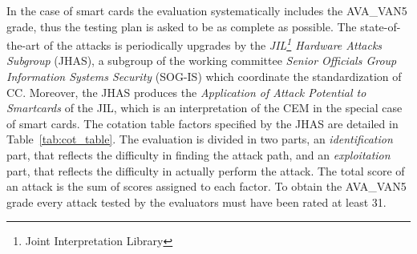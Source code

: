 In the case of smart cards the evaluation systematically includes the AVA\_VAN5 grade, thus the testing plan is asked to be as complete as possible. The state-of-the-art of the attacks is periodically upgrades by the \emph{JIL\footnote{Joint Interpretation Library} Hardware Attacks Subgroup} (JHAS), a subgroup of the working committee \emph{Senior Officials Group Information Systems Security} (SOG-IS) which coordinate the standardization of CC. Moreover, the JHAS produces the \emph{Application of Attack Potential to Smartcards} \cite{JIL} of the JIL, which is an interpretation of the CEM in the special case of smart cards. The cotation table factors specified by the JHAS are detailed in Table~\ref{tab:cot_table}. The evaluation is divided in two parts, an \emph{identification} part, that reflects the difficulty in finding the attack path, and an \emph{exploitation} part, that reflects the difficulty in actually perform the attack. The total score of an attack is the sum of scores assigned to each factor. To obtain the AVA\_VAN5 grade every attack tested by the evaluators must have been rated at least 31.\\



